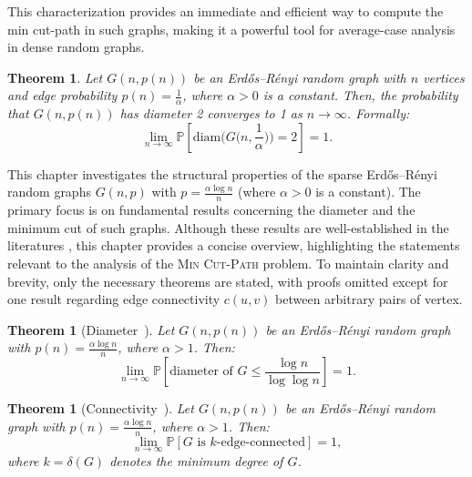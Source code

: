 \documentclass[journal ]{new-aiaa}
\numberwithin{equation}{section}
\theoremstyle{definition}
\theoremstyle{plain}
\newtheorem{theorem}[definition]{Theorem}
\theoremstyle{remark}
\begin{document}
This characterization provides an immediate and efficient way to compute the min cut-path in such graphs, making it a powerful tool for average-case analysis in dense random graphs.



\begin{theorem}
\label{theorem:diameter_2_random_graph}
Let \(G(n, p(n))\) be an Erdős–Rényi random graph with \(n\) vertices and edge probability \(p(n) = \frac{1}{\alpha}\), where \(\alpha > 0\) is a constant. Then, the probability that \(G(n, p(n))\) has diameter 2 converges to 1 as \(n \to \infty\). Formally:
\[
\lim_{n \to \infty} \mathbb{P}\!\left[\text{diam}\bigl(G\bigl(n, \frac{1}{\alpha}\bigr)\bigr) = 2\right] = 1.
\]

\end{theorem}


This chapter investigates the structural properties of the sparse Erdős–Rényi random graphs \( G(n, p) \) with \( p = \frac{\alpha \log n}{n} \) (where \( \alpha > 0 \) is a constant). The primary focus is on fundamental results concerning the diameter and the minimum cut of such graphs. Although these results are well-established in the literatures \cite{Bollobas2001,Frieze2016}, this chapter provides a concise overview, highlighting the statements relevant to the analysis of the \textsc{Min Cut-Path} problem. To maintain clarity and brevity, only the necessary theorems are stated, with proofs omitted except for one result regarding edge connectivity \( c(u,v) \) between arbitrary pairs of vertex.


\begin{theorem} [Diameter~\cite{Bollobas2001}]
\label{theorem:diameter_log}
Let \( G(n, p(n)) \) be an Erdős–Rényi random graph with \( p(n) = \frac{\alpha \log n}{n} \), where \( \alpha > 1 \). Then:
\[
\lim_{n\to\infty} \mathbb{P}\left[ \text{diameter of } G \leq \frac{\log n}{\log \log n} \right] =1.
\]
\end{theorem}


\begin{theorem} [Connectivity~\cite{Frieze2016}]
\label{theorem:k-edge-connectivity}
Let \( G(n, p(n)) \) be an Erdős–Rényi random graph with \( p(n) = \frac{\alpha \log n}{n} \), where \( \alpha > 1 \). Then:
\[
\lim_{n\to\infty} \mathbb{P}\left[ G \text{ is } k\text{-edge-connected} \right] = 1,
\]
where \( k= \delta(G) \) denotes the minimum degree of \( G \).
\end{theorem}
\end{document}
